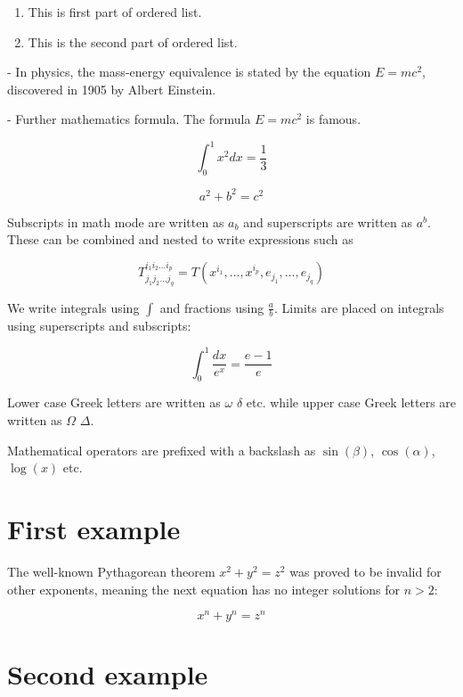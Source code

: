 \documentclass[12pt, letterpaper]{article}
\begin{document}
	
	\begin{enumerate}
		\item This is first part of ordered list.
		\item This is the second part of ordered list.
	\end{enumerate}	
	
	
	- In physics, the mass-energy equivalence is stated 
	by the equation $E=mc^2$, discovered in 1905 by Albert Einstein.
	
	- Further mathematics formula.
	The formula $E = mc^2$ is famous.
	
	\[
	\int_0^1 x^2 dx = \frac{1}{3}
	\]
	
	\begin{equation}
		a^2 + b^2 = c^2
	\end{equation}
	
	Subscripts in math mode are written as $a_b$ and superscripts are written as $a^b$. These can be combined and nested to write expressions such as
	
	\[ T^{i_1 i_2 \dots i_p}_{j_1 j_2 \dots j_q} = T(x^{i_1},\dots,x^{i_p},e_{j_1},\dots,e_{j_q}) \]
	
	We write integrals using $\int$ and fractions using $\frac{a}{b}$. Limits are placed on integrals using superscripts and subscripts:
	
	\[ \int_0^1 \frac{dx}{e^x} =  \frac{e-1}{e} \]
	
	Lower case Greek letters are written as $\omega$ $\delta$ etc. while upper case Greek letters are written as $\Omega$ $\Delta$.
	
	Mathematical operators are prefixed with a backslash as $\sin(\beta)$, $\cos(\alpha)$, $\log(x)$ etc.
	
	\section{First example}
	
	The well-known Pythagorean theorem \(x^2 + y^2 = z^2\) was proved to be invalid for other exponents, meaning the next equation has no integer solutions for \(n>2\):
	
	\[ x^n + y^n = z^n \]
	
	\section{Second example}
	
\end{document}
